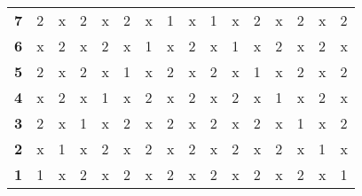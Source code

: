 \documentclass{article}
\begin{document}
\begin{table}[H]
\begin{tabular}{llllllllllllllll}
\multicolumn{1}{l|}{\textbf{7}}  & 2          & x          & 2          & x          & 2          & x          & 1          & x          & 1          & x          & 2          & x          & 2          & x          & 2          \\
\multicolumn{1}{l|}{\textbf{6}}  & x          & 2          & x          & 2          & x          & 1          & x          & 2          & x          & 1          & x          & 2          & x          & 2          & x          \\
\multicolumn{1}{l|}{\textbf{5}}  & 2          & x          & 2          & x          & 1          & x          & 2          & x          & 2          & x          & 1          & x          & 2          & x          & 2          \\
\multicolumn{1}{l|}{\textbf{4}}  & x          & 2          & x          & 1          & x          & 2          & x          & 2          & x          & 2          & x          & 1          & x          & 2          & x          \\
\multicolumn{1}{l|}{\textbf{3}}  & 2          & x          & 1          & x          & 2          & x          & 2          & x          & 2          & x          & 2          & x          & 1          & x          & 2          \\
\multicolumn{1}{l|}{\textbf{2}}  & x          & 1          & x          & 2          & x          & 2          & x          & 2          & x          & 2          & x          & 2          & x          & 1          & x          \\
\multicolumn{1}{l|}{\textbf{1}}  & 1          & x          & 2          & x          & 2          & x          & 2          & x          & 2          & x          & 2          & x          & 2          & x          & 1         
\end{tabular}
\end{table}
\end{document}

